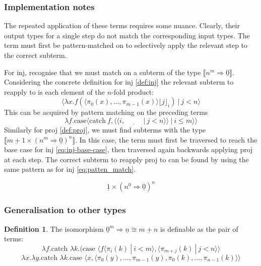 \documentclass[12pt,a4paper]{report}
\theoremstyle{definition}
\theoremstyle{definition}
\newtheorem{definition}{Definition}[chapter]%
\theoremstyle{remark}
\begin{document}
\subsubsection{Implementation notes}
The repeated application of these terms requires some nuance. Clearly, their output types for a single step do not match the corresponding input types. The term must first be pattern-matched on to selectively apply the relevant step to the correct subterm. 

For inj, recognise that we must match on a subterm of the type  $\llbracket n^{m} \Rightarrow \underline{0} \rrbracket$. Considering the concrete definition for inj \eqref{def:inj} the relevant subterm to reapply to is each element of the $n$-fold product:
\[
    \langle \lambda x.f(\langle \pi_0(x),\dots,\pi_{m-1}(x)\rangle \lfloor j \rfloor_i)\ |\ j < n  \rangle
\]
This can be acquired by pattern matching on the preceding terms 
\begin{equation}\label{eq:patten_match}
    \lambda f.\text{case}\langle \text{catch}\ f, \langle \langle i,\underline{\hspace{1cm}}\ |\ j < n  \rangle \rangle\ |\ i \leq m \rangle \rangle
\end{equation}
Similarly for proj \eqref{def:proj}, we must find subterms with the type $\llbracket \underline{m+1} \times (n^m \Rightarrow \underline{0})^n \rrbracket$. In this case, the term must first be traversed to reach the base case for inj \eqref{eq:inj-base-case}, then traversed again backwards applying proj at each step. The correct subterm to reapply proj to can be found by using the same pattern as for inj \eqref{eq:patten_match}.

\begin{equation}\label{eq:inj-base-case}
    \underline{1} \times(n^0 \Rightarrow \underline{0})^n
\end{equation}

\subsubsection{Generalisation to other types}

\begin{definition}\label{eq:nats-as-empty-product}
    The isomorphism $\underline{0}^m \Rightarrow \underline{n} \cong \underline{m + n}$ is definable as the pair of terms:
    \begin{equation}
        \lambda f. \text{catch } \lambda k. (\text{case }\langle f \langle \pi_i(k)\ |\ i < m\rangle , \langle \pi_{m+j}(k)\ |\ j < n \rangle \rangle
    \end{equation}
    \begin{equation}
        \lambda x. \lambda y. \text{catch } \lambda k. \text{case } \langle x, \langle \pi_0(y),\dots,\pi_{m-1}(y), \pi_0(k),\dots,\pi_{n-1}(k)\rangle \rangle
    \end{equation}
\end{definition}
\end{document}
